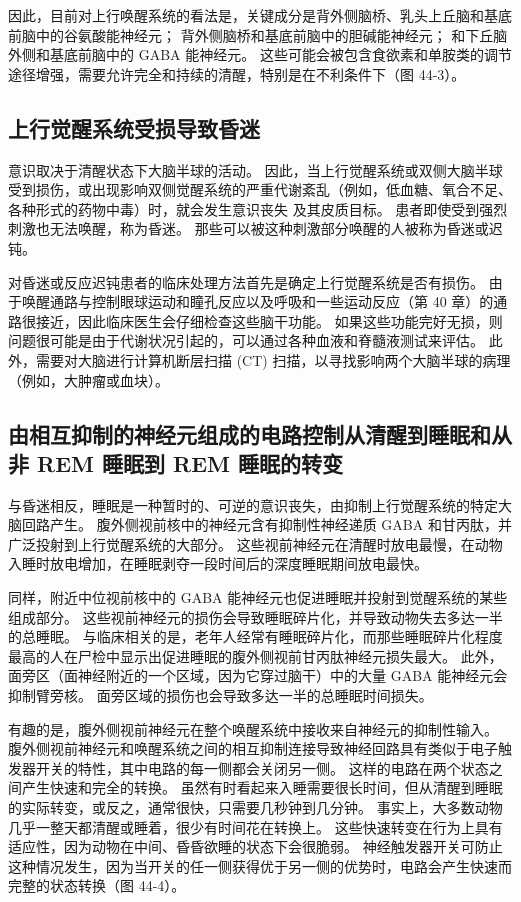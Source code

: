 因此，目前对上行唤醒系统的看法是，关键成分是背外侧脑桥、乳头上丘脑和基底前脑中的谷氨酸能神经元； 背外侧脑桥和基底前脑中的胆碱能神经元； 和下丘脑外侧和基底前脑中的 GABA 能神经元。 这些可能会被包含食欲素和单胺类的调节途径增强，需要允许完全和持续的清醒，特别是在不利条件下（图 44-3）。


\subsection{上行觉醒系统受损导致昏迷}
意识取决于清醒状态下大脑半球的活动。 因此，当上行觉醒系统或双侧大脑半球受到损伤，或出现影响双侧觉醒系统的严重代谢紊乱（例如，低血糖、氧合不足、各种形式的药物中毒）时，就会发生意识丧失 及其皮质目标。 患者即使受到强烈刺激也无法唤醒，称为昏迷。 那些可以被这种刺激部分唤醒的人被称为昏迷或迟钝。

对昏迷或反应迟钝患者的临床处理方法首先是确定上行觉醒系统是否有损伤。 由于唤醒通路与控制眼球运动和瞳孔反应以及呼吸和一些运动反应（第 40 章）的通路很接近，因此临床医生会仔细检查这些脑干功能。 如果这些功能完好无损，则问题很可能是由于代谢状况引起的，可以通过各种血液和脊髓液测试来评估。 此外，需要对大脑进行计算机断层扫描 (CT) 扫描，以寻找影响两个大脑半球的病理（例如，大肿瘤或血块）。

\subsection{由相互抑制的神经元组成的电路控制从清醒到睡眠和从非 REM 睡眠到 REM 睡眠的转变}
与昏迷相反，睡眠是一种暂时的、可逆的意识丧失，由抑制上行觉醒系统的特定大脑回路产生。 腹外侧视前核中的神经元含有抑制性神经递质 GABA 和甘丙肽，并广泛投射到上行觉醒系统的大部分。 这些视前神经元在清醒时放电最慢，在动物入睡时放电增加，在睡眠剥夺一段时间后的深度睡眠期间放电最快。

同样，附近中位视前核中的 GABA 能神经元也促进睡眠并投射到觉醒系统的某些组成部分。 这些视前神经元的损伤会导致睡眠碎片化，并导致动物失去多达一半的总睡眠。 与临床相关的是，老年人经常有睡眠碎片化，而那些睡眠碎片化程度最高的人在尸检中显示出促进睡眠的腹外侧视前甘丙肽神经元损失最大。 此外，面旁区（面神经附近的一个区域，因为它穿过脑干）中的大量 GABA 能神经元会抑制臂旁核。 面旁区域的损伤也会导致多达一半的总睡眠时间损失。

有趣的是，腹外侧视前神经元在整个唤醒系统中接收来自神经元的抑制性输入。 腹外侧视前神经元和唤醒系统之间的相互抑制连接导致神经回路具有类似于电子触发器开关的特性，其中电路的每一侧都会关闭另一侧。 这样的电路在两个状态之间产生快速和完全的转换。 虽然有时看起来入睡需要很长时间，但从清醒到睡眠的实际转变，或反之，通常很快，只需要几秒钟到几分钟。 事实上，大多数动物几乎一整天都清醒或睡着，很少有时间花在转换上。 这些快速转变在行为上具有适应性，因为动物在中间、昏昏欲睡的状态下会很脆弱。 神经触发器开关可防止这种情况发生，因为当开关的任一侧获得优于另一侧的优势时，电路会产生快速而完整的状态转换（图 44-4）。


